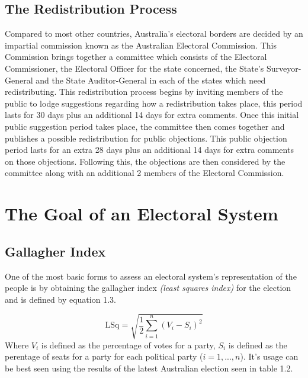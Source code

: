 \documentclass{report}
\begin{document}
  \subsection{The Redistribution Process}
  Compared to most other countries, Australia's electoral borders are decided by an impartial commission known as the Australian Electoral Commission. This Commission brings together a committee which consists of the Electoral Commissioner, the Electoral Officer for the state concerned, the State's Surveyor-General and the State Auditor-General in each of the states which need redistributing. \newline
  This redistribution process begins by inviting members of the public to lodge suggestions regarding how a redistribution takes place, this period lasts for 30 days plus an additional 14 days for extra comments. \newline
  Once this initial public suggestion period takes place, the committee then comes together and publishes a possible redistribution for public objections. This public objection period lasts for an extra 28 days plus an additional 14 days for extra comments on those objections. \newline
  Following this, the objections are then considered by the committee along with an additional 2 members of the Electoral Commission.

  \section{The Goal of an Electoral System}
  \subsection{Gallagher Index}
  One of the most basic forms to assess an electoral system's representation of the people is by obtaining the gallagher index \textit{(least squares index)} for the election and is defined by equation 1.3.

  \begin{equation}
    \textrm{LSq}=\sqrt{\frac{1}{2} \sum_{i=1}^n (V_i-S_i)^2}
  \end{equation}
  Where $V_i$ is defined as the percentage of votes for a party, $S_i$ is defined as the perentage of seats for a party for each political party ($i=1,...,n$). It's usage can be best seen using the results of the latest Australian election seen in table 1.2.
\end{document}
